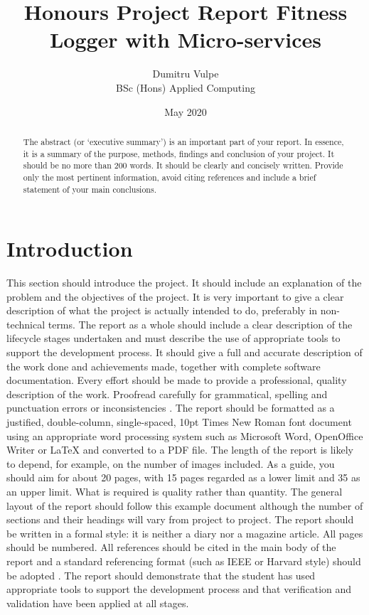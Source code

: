 \documentclass[twocolumn]{article}
\title{Honours Project Report Fitness Logger with Micro-services}
\author{Dumitru Vulpe\\BSc (Hons) Applied Computing}
\date{May 2020}
\begin{document}
\maketitle


\begin{abstract}
The abstract (or ‘executive summary’) is an important part of your report. In essence, it is a summary of the purpose, methods, findings and conclusion of your project. It should be no more than 200 words. It should be clearly and concisely written. Provide only the most pertinent information, avoid citing references and include a brief statement of your main conclusions.  
\end{abstract}


\section{Introduction}
\vspace{-1ex}

This section should introduce the project. It should include an explanation of the problem and the objectives of the project. It is very important to give a clear description of what the project is actually intended to do, preferably in non-technical terms. The report as a whole should include a clear description of the lifecycle stages undertaken and must describe the use of appropriate tools to support the development process. It should give a full and accurate description of the work done and achievements made, together with complete software documentation. Every effort should be made to provide a professional, quality description of the work. Proofread carefully for grammatical, spelling and punctuation errors or inconsistencies \cite{BBC}. The report should be formatted as a justified, double-column, single-spaced, 10pt Times New Roman font document using an appropriate word processing system such as Microsoft Word, OpenOffice Writer or LaTeX and converted to a PDF file. The length of the report is likely to depend, for example, on the number of images included. As a guide, you should aim for about 20 pages, with 15 pages regarded as a lower limit and 35 as an upper limit. What is required is quality rather than quantity. The general layout of the report should follow this example document although the number of sections and their headings will vary from project to project. The report should be written in a formal style: it is neither a diary nor a magazine article. All pages should be numbered. All references should be cited in the main body of the report and a standard referencing format (such as IEEE or Harvard style) should be adopted \cite{Wilde}. The report should demonstrate that the student has used appropriate tools to support the development process and that verification and validation have been applied at all stages. 
	
\end{document}
